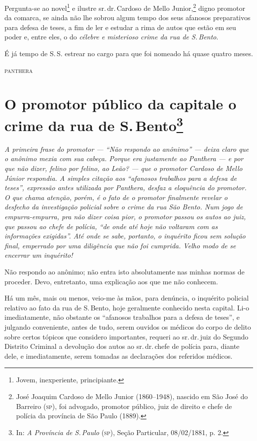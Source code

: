 {Pergunta-se ao novel\footnote{Jovem, inexperiente, principiante.} e
ilustre sr.\,dr.\,Cardoso de Mello Junior,\footnote{José Joaquim Cardoso \label{jjcmj}
  de Mello Junior (1860--1948), nascido em São José do Barreiro (\textsc{sp}), foi
  advogado, promotor público, juiz de direito e chefe de polícia da
  província de São Paulo (1889).}
digno promotor da comarca,
se ainda não lhe sobrou algum tempo dos seus afanosos preparativos para
defesa de teses, a fim de ler e estudar a rima de autos que estão em seu
poder e, entre eles, o do \emph{célebre e misterioso crime da rua de S.\,Bento}.

É já tempo de S.\,S. estrear no cargo para que foi nomeado há quase
quatro meses.

\hfill\textsc{panthera}

\pagebreak
\section{O promotor público da capital\break e o crime da rua de S.\,Bento\protect\footnote{\MakeUppercase{I}n: \emph{\MakeUppercase{A} \MakeUppercase{P}rovíncia de \MakeUppercase{S.\,P}aulo} (\textsc{sp}), \MakeUppercase{S}eção \MakeUppercase{P}articular, 08/02/1881, p. 2.}}

\begin{resumo}
\emph{A primeira frase do promotor --- ``Não respondo ao anônimo'' --- deixa
claro que o anônimo mexia com sua cabeça. Porque era justamente ao
Panthera --- e por que não dizer, felino por felino, ao
Leão? --- que o promotor Cardoso de Mello Júnior respondia. A
simples citação aos ``afanosos trabalhos para a defesa de teses'',
expressão antes utilizada por Panthera, desfaz a eloquência do
promotor. O que chama atenção, porém, é o fato de o promotor finalmente
revelar o desfecho da investigação policial sobre o crime da rua São
Bento. Num jogo de empurra-empurra, pra não dizer coisa pior, o promotor
passou os autos ao juiz, que passou ao chefe de polícia, ``de onde até
hoje não voltaram com as informações exigidas''. Até onde se sabe,
portanto, o inquérito ficou sem solução final, emperrado por uma
diligência que não foi cumprida. Velho modo de se encerrar um
inquérito!}
\end{resumo}

Não respondo ao anônimo; não entra isto absolutamente nas minhas normas
de proceder. Devo, entretanto, uma explicação aos que me não conhecem.

Há um mês, mais ou menos, veio-me às mãos, para denúncia, o inquérito
policial relativo ao fato da rua de S.\,Bento, hoje geralmente conhecido
nesta capital. Li-o imediatamente, não obstante os ``afanosos trabalhos
para a defesa de teses'', e julgando conveniente, antes de tudo, serem
ouvidos os médicos do corpo de delito sobre certos tópicos que considero
importantes, requeri ao sr.\,dr.\,juiz do Segundo Distrito Criminal a
devolução dos autos ao sr.\,dr.\,chefe de polícia para, diante dele, e
imediatamente, serem tomadas as declarações dos referidos médicos.

}
